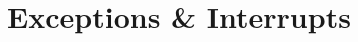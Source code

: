 \documentclass[]{slides}
\title{Exceptions \& Interrupts}
\begin{document}
\printpdftrue %
\begin{frame} \titlepage \end{frame}

\end{document}
